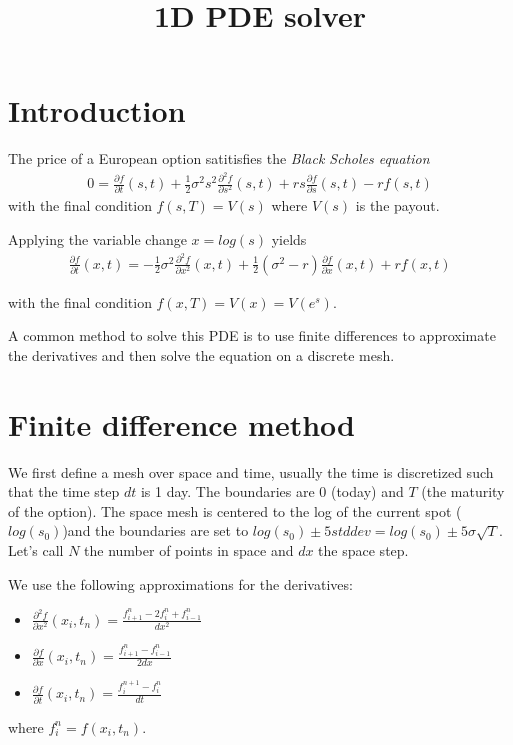 \documentclass[a4paper]{article}
\begin{document}
\title{1D PDE solver}

\section{Introduction}

The price of a European option satitisfies the \textit{Black Scholes equation}
\begin{gather*}
0 = \frac{\partial f}{\partial t}(s, t) + \frac{1}{2}\sigma^2 s^2 \frac{\partial^2 f}{\partial s^2}(s, t)
+ r s \frac{\partial f}{\partial s}(s, t) - rf(s, t)
\end{gather*}
with the final condition $f(s, T) = V(s)$ where $V(s)$ is the payout.

Applying the variable change $x = log(s)$ yields
\begin{gather*}
\frac{\partial f}{\partial t}(x, t) = -\frac{1}{2}\sigma^2 \frac{\partial^2 f}{\partial x^2}(x, t)
+ \frac{1}{2}(\sigma^2 - r) \frac{\partial f}{\partial x}(x, t) + rf(x, t)
\end{gather*}

with the final condition $f(x, T) = V(x) = V(e^s)$.

A common method to solve this PDE is to use finite differences to approximate the derivatives and then
solve the equation on a discrete mesh.

\section{Finite difference method}

We first define a mesh over space and time, usually the time is discretized such that the time step $dt$ is 1 day.
The boundaries are $0$ (today) and $T$ (the maturity of the option). The space mesh is centered to the log of the
current spot ($log(s_0)$)and the boundaries are set to $log(s_0) \pm5stddev = log(s_0) \pm 5 \sigma \sqrt{T}$.
Let's call $N$ the number of points in space and $dx$ the space step.

We use the following approximations for the derivatives:

\begin{itemize}
\item $\frac{\partial^2 f}{\partial x^2}(x_i, t_n) = \frac{f_{i+1}^n - 2 f_i^n + f_{i-1}^n}{dx^2}$
\item $\frac{\partial f}{\partial x}(x_i, t_n) = \frac{f_{i+1}^n - f_{i-1}^n}{2dx}$
\item $\frac{\partial f}{\partial t}(x_i, t_n) = \frac{f_i^{n+1} - f_i^{n}}{dt}$
\end{itemize}
where ${f_i^n = f(x_i, t_n)}$.
\end{document}
